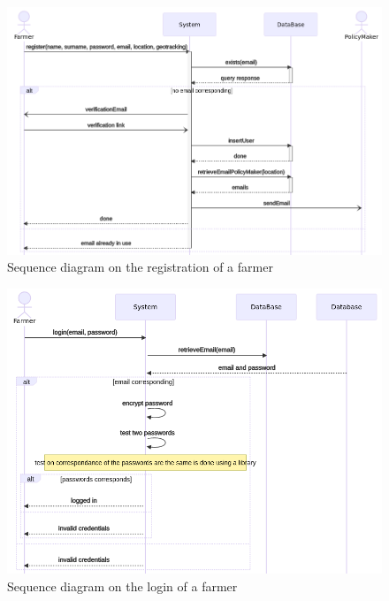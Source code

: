 \begin{figure}
	
	\centering
	
	\includegraphics[width=\textwidth]{Images/seq_registration.png}
	
	\caption{\label{fig:seqregistration} Sequence diagram on the registration of a farmer}
	
\end{figure}



\begin{figure}
	
	\centering
	
	\includegraphics[width=\textwidth]{Images/seq_login.png}
	
	\caption{\label{fig:seqlogin} Sequence diagram on the login of a farmer}
	
\end{figure}



